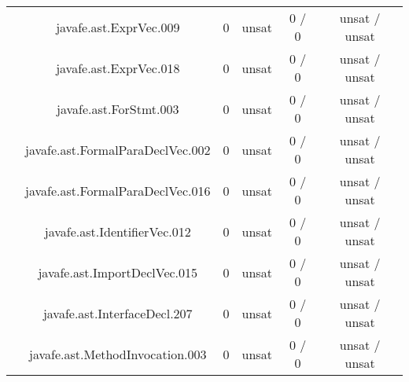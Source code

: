 \begin{table}[htbp]
\begin{minipage}{0.60\textwidth}
{\begin{tabular}[c]{c c!{\vrule width 1.5pt}c|c!{\vrule width 1.5pt}c|c|}
		 	& javafe.ast.ExprVec.009 	    			      & 0    & unsat   & 0  / 0    & unsat / unsat  \\
		 	& javafe.ast.ExprVec.018	   			      & 0    & unsat   & 0  / 0    & unsat / unsat  \\
		 	& javafe.ast.ForStmt.003	    			      & 0    & unsat   & 0  / 0    & unsat / unsat  \\
		 	& javafe.ast.FormalParaDeclVec.002			      & 0    & unsat   & 0  / 0    & unsat / unsat  \\
		 	& javafe.ast.FormalParaDeclVec.016		              & 0    & unsat   & 0  / 0    & unsat / unsat  \\
		 	& javafe.ast.IdentifierVec.012    			      & 0    & unsat   & 0  / 0    & unsat / unsat  \\
		 	& javafe.ast.ImportDeclVec.015	    			      & 0    & unsat   & 0  / 0    & unsat / unsat  \\
		 	& javafe.ast.InterfaceDecl.207	    			      & 0    & unsat   & 0  / 0    & unsat / unsat  \\
		 	& javafe.ast.MethodInvocation.003    			      & 0    & unsat   & 0  / 0    & unsat / unsat  \\

\end{tabular}}
\end{minipage}
\end{table}
